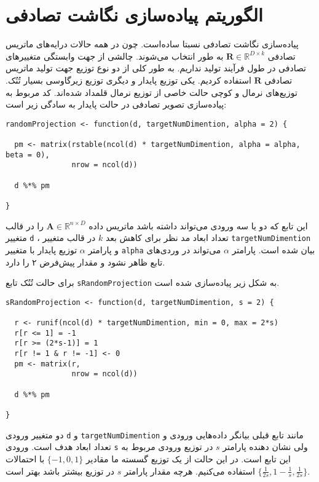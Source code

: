 \section{
الگوریتم پیاده‌سازی نگاشت تصادفی
}

پیاده‌سازی نگاشت تصادفی نسبتا ساده‌است. چون در همه حالات درایه‌های ماتریس تصادفی 
$\mathbf{R} \in \mathbb{R}^{D \times k}$
به طور 
انتخاب می‌شوند. چالشی از جهت وابستگی متغییر‌های تصادفی در طول فرآیند تولید نداریم. به طور کلی از دو نوع توزیع جهت تولید ماتریس تصادفی 
$\mathbf{R}$
استفاده کردیم. یکی توزیع پایدار و دیگری توزیع زیرگاوسی بسیار تُنُک. توزیع‌های نرمال و کوچی حالت خاصی از توزیع نرمال قلمداد شده‌اند.
کد مربوط به پیاده‌سازی تصویر تصادفی در حالت پایدار به سادگی زیر است:

\begin{latin}
\begin{Verbatim}[baselinestretch=0.75]
randomProjection <- function(d, targetNumDimention, alpha = 2) {
  
  pm <- matrix(rstable(ncol(d) * targetNumDimention, alpha = alpha, beta = 0),
               nrow = ncol(d))
  
  d %*% pm
  
}
\end{Verbatim}
\end{latin}

این تابع که دو یا سه ورودی می‌تواند داشته باشد ماتریس داده 
$\mathbf{A} \in \mathbb{R}^{n \times D}$
را در قالب متغییر 
\verb|d|%
، تعداد ابعاد مد نظر برای  کاهش بعد
$k$
در قالب متغییر
\verb|targetNumDimention|
و پارامتر 
$\alpha$
توزیع پایدار با متغییر
\verb|alpha|
بیان شده است. پارامتر 
$\alpha$
می‌تواند در وردی‌های تابع ظاهر نشود و مقدار پیش‌فرض ۲ را دارد.

برای حالت تُنُک تابع 
\verb|sRandomProjection|
به شکل زیر پیاده‌سازی شده است.

\begin{latin}
\begin{Verbatim}[baselinestretch=0.75]
sRandomProjection <- function(d, targetNumDimention, s = 2) {
  
  r <- runif(ncol(d) * targetNumDimention, min = 0, max = 2*s)
  r[r <= 1] = -1
  r[r >= (2*s-1)] = 1
  r[r != 1 & r != -1] <- 0
  pm <- matrix(r,
               nrow = ncol(d))
  
  d %*% pm
  
}
\end{Verbatim}
\end{latin}

دو متغییر ورودی 
\verb|d|
و
\verb|targetNumDimention|
مانند تابع قبلی بیانگر داده‌هایی ورودی و تعداد ابعاد هدف است. ورودی
\verb|s|
ولی نشان دهنده پارامتر
$s$
در توزیع ورودی مربوط به این تابع است. در این حالت از یک توزیع گسسته‌ ما مقادیر 
$\{-1, 0, 1\}$
با احتمالات
$\{ \frac{1}{2s}, 1-\frac{1}{s}, \frac{1}{2s} \}$
استفاده می‌کنیم. هرچه مقدار پارامتر 
$s$
در توزیع بیشتر باشد بهتر است.



